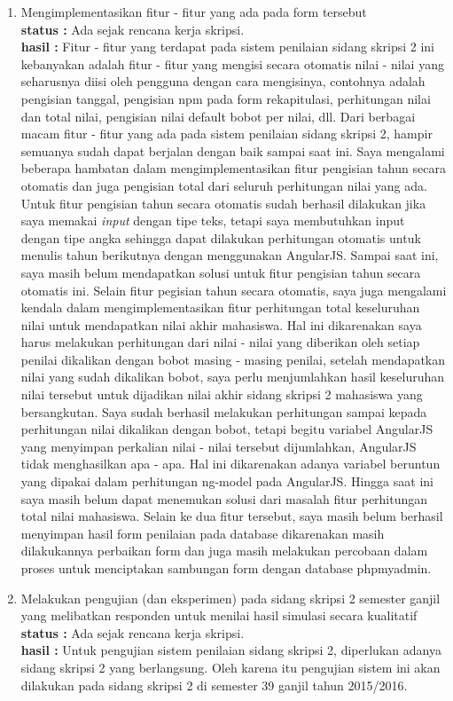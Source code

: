 \documentclass[a4paper,twoside]{article}
\begin{document}
\begin{enumerate}
		\item Mengimplementasikan fitur - fitur yang ada pada form tersebut\\
		{\bf status :} Ada sejak rencana kerja skripsi.\\
		{\bf hasil :} Fitur - fitur yang terdapat pada sistem penilaian sidang skripsi 2 ini kebanyakan adalah fitur - fitur yang mengisi secara otomatis nilai - nilai yang seharusnya diisi oleh pengguna dengan cara mengisinya, contohnya adalah pengisian tanggal, pengisian npm pada form rekapitulasi, perhitungan nilai dan total nilai, pengisian nilai default bobot per nilai, dll. Dari berbagai macam fitur - fitur yang ada pada sistem penilaian sidang skripsi 2, hampir semuanya sudah dapat berjalan dengan baik sampai saat ini. Saya mengalami beberapa hambatan dalam mengimplementasikan fitur pengisian tahun secara otomatis dan juga pengisian total dari seluruh perhitungan nilai yang ada. Untuk fitur pengisian tahun secara otomatis sudah berhasil dilakukan jika saya memakai \textit{input} dengan tipe teks, tetapi saya membutuhkan input dengan tipe angka sehingga dapat dilakukan perhitungan otomatis untuk menulis tahun berikutnya dengan menggunakan AngularJS. Sampai saat ini, saya masih belum mendapatkan solusi untuk fitur pengisian tahun secara otomatis ini. Selain fitur pegisian tahun secara otomatis, saya juga mengalami kendala dalam mengimplementasikan fitur perhitungan total keseluruhan nilai untuk mendapatkan nilai akhir mahasiswa. Hal ini dikarenakan saya harus melakukan perhitungan dari nilai - nilai yang diberikan oleh setiap penilai dikalikan dengan bobot masing - masing penilai, setelah mendapatkan nilai yang sudah dikalikan bobot, saya perlu menjumlahkan hasil keseluruhan nilai tersebut untuk dijadikan nilai akhir sidang skripsi 2 mahasiswa yang bersangkutan. Saya sudah berhasil melakukan perhitungan sampai kepada perhitungan nilai dikalikan dengan bobot, tetapi begitu variabel AngularJS yang menyimpan perkalian nilai - nilai tersebut dijumlahkan, AngularJS tidak menghasilkan apa - apa. Hal ini dikarenakan adanya variabel beruntun yang dipakai dalam perhitungan ng-model pada AngularJS. Hingga saat ini saya masih belum dapat menemukan solusi dari masalah fitur perhitungan total nilai mahasiswa. Selain ke dua fitur tersebut, saya masih belum berhasil menyimpan hasil form penilaian pada database dikarenakan masih dilakukannya perbaikan form dan juga masih melakukan percobaan dalam proses untuk menciptakan sambungan form dengan database phpmyadmin.

		\item Melakukan pengujian (dan eksperimen) pada sidang skripsi 2 semester ganjil yang melibatkan responden untuk menilai hasil simulasi secara kualitatif
		{\bf status :} Ada sejak rencana kerja skripsi.\\
		{\bf hasil :} Untuk pengujian sistem penilaian sidang skripsi 2, diperlukan adanya sidang skripsi 2 yang berlangsung. Oleh karena itu pengujian sistem ini akan dilakukan pada sidang skripsi 2 di semester 39 ganjil tahun 2015/2016.


\end{enumerate}
\end{document}
